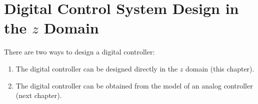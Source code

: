 \section{Digital Control System Design in the $z$ Domain}\label{sec:design}


There are two ways to design a digital controller:
\begin{enumerate}
  \item The digital controller can be designed directly in the $z$ domain (this chapter).
  \item The digital controller can be obtained from the model of an analog controller (next chapter).
\end{enumerate}

